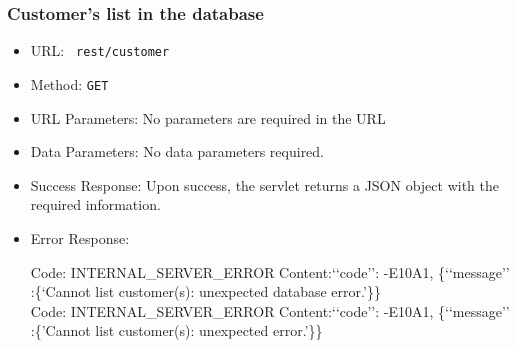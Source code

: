 \subsubsection*{Customer's list in the database}

\begin{itemize}
    \item URL: \texttt{ rest/customer}
    \item Method: \texttt{GET}
    \item URL Parameters: No parameters are required in the URL
    \item Data Parameters: No data parameters required.
    \item Success Response: Upon success, the servlet returns a JSON object with the required information.
    \item Error Response:
    
Code: INTERNAL\_SERVER\_ERROR \newline
Content:‘‘code’’: -E10A1, \{‘‘message’’ :\{‘Cannot list customer(s): unexpected database error.'\}\}
\\
Code: INTERNAL\_SERVER\_ERROR \newline
Content:‘‘code’’: -E10A1, \{‘‘message’’ :\{'Cannot list customer(s): unexpected error.'\}\}
\end{itemize}


